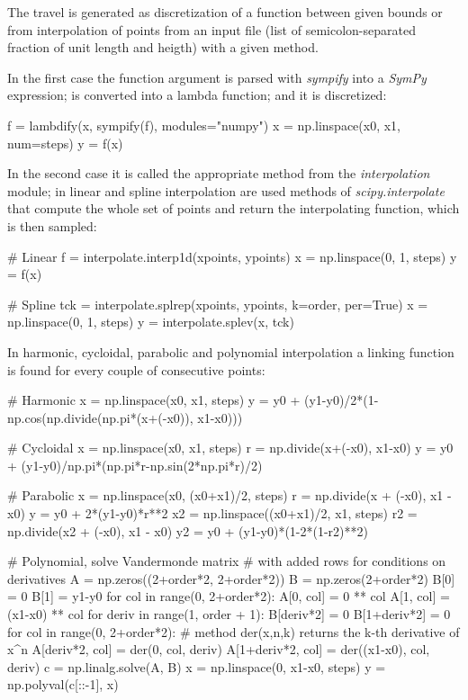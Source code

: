 \documentclass[a4paper,10pt,twoside]{article}
\begin{document}
    The travel is generated as discretization of a function between given bounds or
    from interpolation of points from an input file (list of semicolon-separated fraction of unit length and heigth)
    with a given method.

    In the first case the function argument is parsed with \emph{sympify} into
    a \emph{SymPy} expression; is converted into a lambda function; and it is discretized:

    \begin{pycode}
    f = lambdify(x, sympify(f), modules="numpy")
    x = np.linspace(x0, x1, num=steps)
    y = f(x)
    \end{pycode}

    In the second case it is called the appropriate method from the \emph{interpolation} module;
    in linear and spline interpolation are used methods of \emph{scipy.interpolate} that
    compute the whole set of points and return the interpolating function, which is then sampled:

    \begin{pycode}
    # Linear
    f = interpolate.interp1d(xpoints, ypoints)
    x = np.linspace(0, 1, steps)
    y = f(x)

    # Spline
    tck = interpolate.splrep(xpoints, ypoints, k=order, per=True)
    x = np.linspace(0, 1, steps)
    y = interpolate.splev(x, tck)
    \end{pycode}

    In harmonic, cycloidal, parabolic and polynomial interpolation a linking function is found
    for every couple of consecutive points:

    \begin{pycode}
    # Harmonic
    x = np.linspace(x0, x1, steps)
    y = y0 + (y1-y0)/2*(1-np.cos(np.divide(np.pi*(x+(-x0)), x1-x0)))
    
    # Cycloidal
    x = np.linspace(x0, x1, steps)
    r = np.divide(x+(-x0), x1-x0)
    y = y0 + (y1-y0)/np.pi*(np.pi*r-np.sin(2*np.pi*r)/2)
    
    # Parabolic
    x = np.linspace(x0, (x0+x1)/2, steps)
    r = np.divide(x + (-x0), x1 - x0)
    y = y0 + 2*(y1-y0)*r**2
    x2 = np.linspace((x0+x1)/2, x1, steps)
    r2 = np.divide(x2 + (-x0), x1 - x0)
    y2 = y0 + (y1-y0)*(1-2*(1-r2)**2)
    
    # Polynomial, solve Vandermonde matrix
    # with added rows for conditions on derivatives
    A = np.zeros((2+order*2, 2+order*2))
    B = np.zeros(2+order*2)
    B[0] = 0
    B[1] = y1-y0
    for col in range(0, 2+order*2):
        A[0, col] = 0 ** col
        A[1, col] = (x1-x0) ** col
    for deriv in range(1, order + 1):
        B[deriv*2] = 0
        B[1+deriv*2] = 0
        for col in range(0, 2+order*2):
            # method der(x,n,k) returns the k-th derivative of x^n
            A[deriv*2, col] = der(0, col, deriv)
            A[1+deriv*2, col] = der((x1-x0), col, deriv)
    c = np.linalg.solve(A, B)
    x = np.linspace(0, x1-x0, steps)
    y = np.polyval(c[::-1], x)
    \end{pycode}
\end{document}
